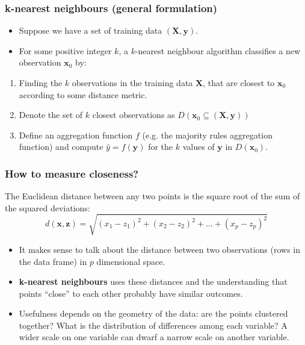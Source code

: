 \documentclass[a4paper]{article}
\begin{document}
\subsubsection{k-nearest neighbours (general formulation)}
\begin{itemize}
	\item Suppose we have a set of training data \( (\symbf{X}, \symbf{y}) \).
	\item For some positive integer \( k \), a \( k \)-nearest neighbour algorithm classifies a new observation \( \symbf{x}_0 \) by:
\end{itemize}	
\begin{enumerate}
	\item Finding the \( k \) observations in the training data \( \symbf{X} \), that are closest to \( \symbf{x}_0 \) according to some distance metric.
	\item Denote the set of \( k \) closest observations as \( D(\symbf{x}_0 \subseteq (\symbf{X}, \symbf{y})) \) 
	\item Define an aggregation function \( f \) (e.g. the majority rules aggregation function) and compute \( \hat{y} = f(\symbf{y}) \) for the \( k \) values of \( \symbf{y} \) in \( D(\symbf{x}_0) \).
\end{enumerate}
\subsubsection{How to measure closeness?}
The Euclidean distance between any two points is the square root of the sum of the squared deviations:
\[
	d(\symbf{x},\symbf{z}) = \sqrt{(x_{1} - z_{1})^2 + (x_{2} - z_{2})^2 + \ldots + (x_{p} - z_{p})^2}
\]
\begin{itemize}
	\item It makes sense to talk about the \textcolor{mygreen}{distance} between two observations (rows in the data frame) in \( p \) dimensional space.
	\item \textcolor{myblue}{\textbf{k-nearest neighbours}} uses these distances and the understanding that points ``close'' to each other probably have similar outcomes.
	\item Usefulness depends on the geometry of the data: are the points clustered together? What is the distribution of differences among each variable? A wider scale on one variable can dwarf a narrow scale on another variable.
\end{itemize}
\end{document}
